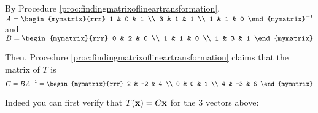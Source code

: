 \begin{solution}
By Procedure \ref{proc:findingmatrixoflineartransformation}, 
$A=  \begin{mymatrix}{rrr}
1 & 0 & 1 \\
3 & 1 & 1 \\
1 & 1 & 0
\end{mymatrix} ^{-1}$ and 
 $B=\begin{mymatrix}{rrr}
0 & 2 & 0 \\
1 & 1 & 0 \\
1 & 3 & 1
\end{mymatrix}$

Then, Procedure \ref{proc:findingmatrixoflineartransformation} claims that the matrix of $T$ is 
\begin{equation*}
C= BA^{-1} 
=\begin{mymatrix}{rrr}
2 & -2 & 4 \\
0 & 0 & 1 \\
4 & -3 & 6
\end{mymatrix}
\end{equation*}

Indeed you can first verify that $T({\bf x})=C{\bf x}$ for the 3 vectors above:


\end{solution}
